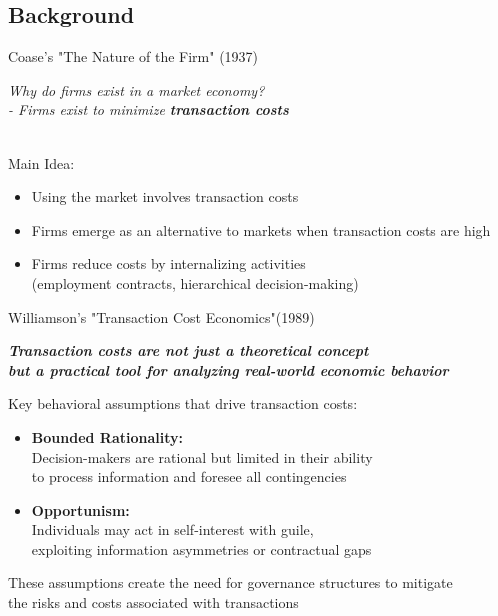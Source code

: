 \documentclass[aspectratio=169]{beamer}  %
\begin{document}
\subsection{Background}
\begin{frame}{Coase's "The Nature of the Firm" (1937)}
\begin{spacing}{1.5}
{
\textit{Why do firms exist in a market economy?\\
- Firms exist to minimize \textbf{transaction costs}\\}
\quad \\
{\small 
Main Idea:
    \begin{itemize}
        \item Using the market involves transaction costs
        \item Firms emerge as an alternative to markets when transaction costs are high
        \item Firms reduce costs by internalizing activities \\
        (employment contracts, hierarchical decision-making)
    \end{itemize}}
}
\end{spacing}
\end{frame}



\begin{frame}{Williamson's "Transaction Cost Economics"(1989)}
\begin{spacing}{1.5}
{
\textit{\textbf{Transaction costs are not just a theoretical concept\\
but a practical tool for analyzing real-world economic behavior\\}
}
{\footnotesize  Key behavioral assumptions that drive transaction costs:
    \begin{itemize}
        \item \textbf{Bounded Rationality:} \\
        Decision-makers are rational but limited in their ability\\ to process information and foresee all contingencies
        \item \textbf{Opportunism:}\\
        Individuals may act in self-interest with guile,\\ exploiting information asymmetries or contractual gaps
        
    \end{itemize}
These assumptions create the need for governance structures to mitigate\\ the risks and costs associated with transactions}}
\end{spacing}
\end{frame}
\end{document}
